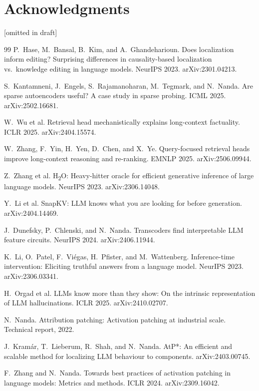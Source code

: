 \documentclass[11pt]{article}
\begin{document}
\section*{Acknowledgments}
[omitted in draft]


\begin{thebibliography}{99}
P.~Hase, M.~Bansal, B.~Kim, and A.~Ghandeharioun.
\newblock Does localization inform editing? Surprising differences in
causality-based localization vs.\ knowledge editing in language models.
\newblock NeurIPS 2023. arXiv:2301.04213.

S.~Kantamneni, J.~Engels, S.~Rajamanoharan, M.~Tegmark, and N.~Nanda.
\newblock Are sparse autoencoders useful? A case study in sparse probing.
\newblock ICML 2025. arXiv:2502.16681.

W.~Wu et al.
\newblock Retrieval head mechanistically explains long-context factuality.
\newblock ICLR 2025. arXiv:2404.15574.

W.~Zhang, F.~Yin, H.~Yen, D.~Chen, and X.~Ye.
\newblock Query-focused retrieval heads improve long-context reasoning and
re-ranking.
\newblock EMNLP 2025. arXiv:2506.09944.

Z.~Zhang et al.
\newblock H\textsubscript{2}O: Heavy-hitter oracle for efficient generative
inference of large language models.
\newblock NeurIPS 2023. arXiv:2306.14048.

Y.~Li et al.
\newblock SnapKV: LLM knows what you are looking for before generation.
\newblock arXiv:2404.14469.

J.~Dunefsky, P.~Chlenski, and N.~Nanda.
\newblock Transcoders find interpretable LLM feature circuits.
\newblock NeurIPS 2024. arXiv:2406.11944.

K.~Li, O.~Patel, F.~Vi\'egas, H.~Pfister, and M.~Wattenberg.
\newblock Inference-time intervention: Eliciting truthful answers from a
language model.
\newblock NeurIPS 2023. arXiv:2306.03341.

H.~Orgad et al.
\newblock LLMs know more than they show: On the intrinsic representation of
LLM hallucinations.
\newblock ICLR 2025. arXiv:2410.02707.

N.~Nanda.
\newblock Attribution patching: Activation patching at industrial scale.
\newblock Technical report, 2022.

J.~Kram\'ar, T.~Lieberum, R.~Shah, and N.~Nanda.
\newblock AtP*: An efficient and scalable method for localizing LLM behaviour
to components.
\newblock arXiv:2403.00745.

F.~Zhang and N.~Nanda.
\newblock Towards best practices of activation patching in language models:
Metrics and methods.
\newblock ICLR 2024. arXiv:2309.16042.
\end{thebibliography}
\end{document}
